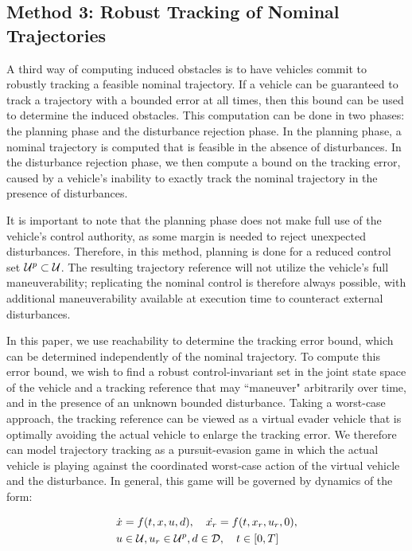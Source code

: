 \subsection{Method 3: Robust Tracking of Nominal Trajectories \label{sec:rtt}}
A third way of computing induced obstacles is to have vehicles commit to robustly tracking a feasible nominal trajectory. If a vehicle can be guaranteed to track a trajectory with a bounded error at all times, then this bound can be used to determine the induced obstacles. This computation can be done in two phases: the planning phase and the disturbance rejection phase. 
In the planning phase, a nominal trajectory is computed that is feasible in the absence of disturbances. In the disturbance rejection phase, we then compute a bound on the tracking error, caused by a vehicle's inability to exactly track the nominal trajectory in the presence of disturbances. 

It is important to note that the planning phase does not make full use of the vehicle's control authority, as some margin is needed to reject unexpected disturbances. Therefore, in this method, planning is done for a reduced control set $\mathcal{U}^p\subset\mathcal{U}$. The resulting trajectory reference will not utilize the vehicle's full maneuverability; replicating the nominal control is therefore always possible, with additional maneuverability available at execution time to counteract external disturbances.

In this paper, we use reachability to determine the tracking error bound, which can be determined independently of the nominal trajectory. To compute this error bound, we wish to find a robust control-invariant set in the joint state space of the vehicle and a tracking reference that may ``maneuver" arbitrarily over time, and in the presence of an unknown bounded disturbance. Taking a worst-case approach, the tracking reference can be viewed as a virtual evader vehicle that is optimally avoiding the actual vehicle to enlarge the tracking error. We therefore can model trajectory tracking as a pursuit-evasion game in which the actual vehicle is playing against the coordinated worst-case action of the virtual vehicle and the disturbance. In general, this game will be governed by dynamics of the form:

\begin{equation}
\label{eq:jdyn} %
\begin{aligned}
\dot{x} &= f(t, x, u, d), \quad \dot{x_r} =f(t,x_r,u_r,0),\\
u &\in \cset, u_r\in\cset^p, d \in \dset, \quad t \in [0, T]
\end{aligned}
\end{equation}

